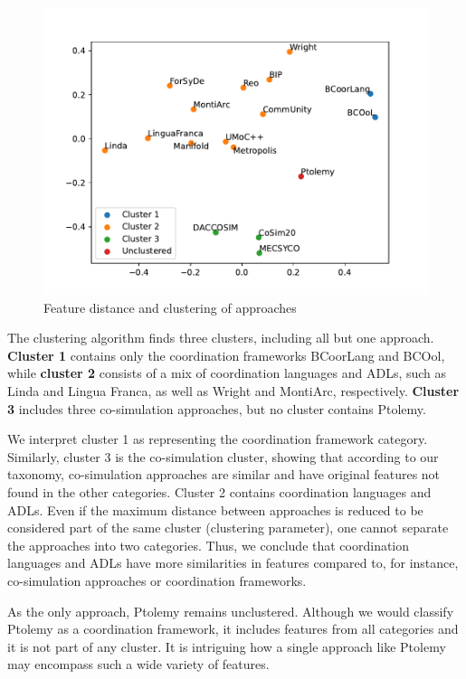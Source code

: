 \documentclass[runningheads]{llncs}
\begin{document}
\begin{figure}[ht]
	\centering
	\includegraphics[width=1\textwidth]{images/approach_scatter}
	\caption{Feature distance and clustering of approaches}
	\label{fig: clusters}
\end{figure}

The clustering algorithm finds three clusters, including all but one approach.
\textbf{Cluster 1} contains only the coordination frameworks BCoorLang and BCOol, 
while \textbf{cluster 2} consists of a mix of coordination languages and ADLs, such as Linda and Lingua Franca, as well as Wright and MontiArc, respectively.
\textbf{Cluster 3} includes three co-simulation approaches, but no cluster contains Ptolemy.

We interpret cluster 1 as representing the coordination framework category.
Similarly, cluster 3 is the co-simulation cluster, showing that according to our taxonomy, co-simulation approaches are similar and have original features not found in the other categories.
Cluster 2 contains coordination languages and ADLs.
Even if the maximum distance between approaches is reduced to be considered part of the same cluster (clustering parameter), one cannot separate the approaches into two categories.
Thus, we conclude that coordination languages and ADLs have more similarities in features compared to, for instance, co-simulation approaches or coordination frameworks.

As the only approach, Ptolemy remains unclustered. 
Although we would classify Ptolemy as a coordination framework, it includes features from all categories and it is not part of any cluster.
It is intriguing how a single approach like Ptolemy may encompass such a wide variety of features.
\end{document}
